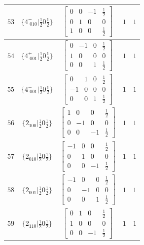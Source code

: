 \documentclass[fleqn,8pt]{jsarticle}
\begin{document}
\begin{longtable}{ccccc}
$ 53 $ & $ \{4^{-}_{\,\,010}|\frac{1}{2} 0 \frac{1}{2}\} $ & $ \begin{bmatrix} 0 & 0 & -1 & \frac{1}{2} \\ 0 & 1 & 0 & 0 \\ 1 & 0 & 0 & \frac{1}{2} \end{bmatrix} $ & $ 1 $ & $ 1 $ \\ \hline
$ 54 $ & $ \{4^{+}_{\,\,001}|\frac{1}{2} 0 \frac{1}{2}\} $ & $ \begin{bmatrix} 0 & -1 & 0 & \frac{1}{2} \\ 1 & 0 & 0 & 0 \\ 0 & 0 & 1 & \frac{1}{2} \end{bmatrix} $ & $ 1 $ & $ 1 $ \\ \hline
$ 55 $ & $ \{4^{-}_{\,\,001}|\frac{1}{2} 0 \frac{1}{2}\} $ & $ \begin{bmatrix} 0 & 1 & 0 & \frac{1}{2} \\ -1 & 0 & 0 & 0 \\ 0 & 0 & 1 & \frac{1}{2} \end{bmatrix} $ & $ 1 $ & $ 1 $ \\ \hline
$ 56 $ & $ \{2{}_{100}|\frac{1}{2} 0 \frac{1}{2}\} $ & $ \begin{bmatrix} 1 & 0 & 0 & \frac{1}{2} \\ 0 & -1 & 0 & 0 \\ 0 & 0 & -1 & \frac{1}{2} \end{bmatrix} $ & $ 1 $ & $ 1 $ \\ \hline
$ 57 $ & $ \{2{}_{010}|\frac{1}{2} 0 \frac{1}{2}\} $ & $ \begin{bmatrix} -1 & 0 & 0 & \frac{1}{2} \\ 0 & 1 & 0 & 0 \\ 0 & 0 & -1 & \frac{1}{2} \end{bmatrix} $ & $ 1 $ & $ 1 $ \\ \hline
$ 58 $ & $ \{2{}_{001}|\frac{1}{2} 0 \frac{1}{2}\} $ & $ \begin{bmatrix} -1 & 0 & 0 & \frac{1}{2} \\ 0 & -1 & 0 & 0 \\ 0 & 0 & 1 & \frac{1}{2} \end{bmatrix} $ & $ 1 $ & $ 1 $ \\ \hline
$ 59 $ & $ \{2{}_{110}|\frac{1}{2} 0 \frac{1}{2}\} $ & $ \begin{bmatrix} 0 & 1 & 0 & \frac{1}{2} \\ 1 & 0 & 0 & 0 \\ 0 & 0 & -1 & \frac{1}{2} \end{bmatrix} $ & $ 1 $ & $ 1 $ \\ \hline

\end{longtable}
\end{document}
